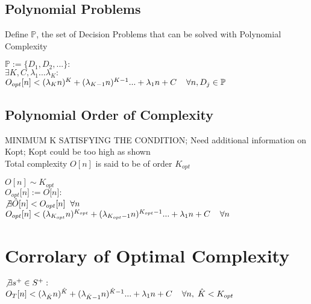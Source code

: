 \documentclass[11pt]{article}
\begin{document}
\subsection{Polynomial Problems}
Define $\mathbb{P}$, the set of Decision Problems that can be solved with Polynomial Complexity
\begin{center}
$
\mathbb{P} := \{D_1,D_2,...\} : 
$
\\
$
\exists K,C,\lambda_1...\lambda_K : 
$
\\
$
O_{opt}[n] < (\lambda_K n)^K + (\lambda_{K-1} n)^{K-1}... + \lambda_1 n + C \hspace{4mm} \forall n, D_j \in \mathbb{P}
$
\end{center}





\subsection{Polynomial Order of Complexity}
MINIMUM K SATISFYING THE CONDITION; Need additional information on Kopt; Kopt could be too high as shown\\
Total complexity $O[n]$ is said to be of order $K_{opt}$
\begin{center}
$
 O[n] \sim K_{opt}
$
\\ \vspace{2mm}
$O_{opt}\lbrack n \rbrack := O \lbrack n \rbrack :$
\\ \vspace{2mm}
$ \not \exists \hat{O} \lbrack n \rbrack < O_{opt}\lbrack n \rbrack \hspace{2mm} \forall n$
\\ \vspace{2mm}
$O_{opt}[n] < (\lambda_{K_{opt}} n)^{K_{opt}} + (\lambda_{K_{opt}-1} n)^{K_{opt}-1}... + \lambda_1 n +  C \hspace{4mm} \forall n$
\end{center}





\section{Corrolary of Optimal Complexity}
\begin{center}
$\not \exists s^+ \in S^+ :$
\\ \vspace{2mm}
$O_{T}[n] < (\lambda_{\hat{K}} n)^{\hat{K}} + (\lambda_{\hat{K}-1} n)^{\hat{K}-1}... + \lambda_1 n +  C \hspace{4mm} \forall n,\hspace{1mm} \hat{K} < K_{opt}$
\end{center}
\end{document}
